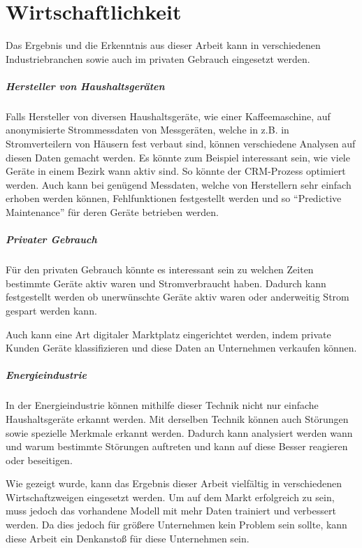 \chapter{Wirtschaftlichkeit}
    Das Ergebnis und die Erkenntnis aus dieser Arbeit kann in verschiedenen Industriebranchen sowie auch im privaten Gebrauch eingesetzt werden.

    \paragraph{Hersteller von Haushaltsgeräten}
    Falls Hersteller von diversen Haushaltsgeräte, wie einer Kaffeemaschine, auf anonymisierte Strommessdaten von Messgeräten, welche in z.B. in Stromverteilern von Häusern fest verbaut sind, können verschiedene Analysen auf diesen Daten gemacht werden.
    Es könnte zum Beispiel interessant sein, wie viele Geräte in einem Bezirk wann aktiv sind. 
    So könnte der \ac{CRM}-Prozess optimiert werden.
    Auch kann bei genügend Messdaten, welche von Herstellern sehr einfach erhoben werden können, Fehlfunktionen festgestellt werden und so "`Predictive Maintenance"' für deren Geräte betrieben werden.

    \paragraph{Privater Gebrauch}
    Für den privaten Gebrauch könnte es interessant sein zu welchen Zeiten bestimmte Geräte aktiv waren und Stromverbraucht haben.
    Dadurch kann festgestellt werden ob unerwünschte Geräte aktiv waren oder anderweitig Strom gespart werden kann.
    
    Auch kann eine Art digitaler Marktplatz eingerichtet werden, indem private Kunden Geräte klassifizieren und diese Daten an Unternehmen verkaufen können.

    \paragraph{Energieindustrie}
    In der Energieindustrie können mithilfe dieser Technik nicht nur einfache Haushaltsgeräte erkannt werden. 
    Mit derselben Technik können auch Störungen sowie spezielle Merkmale erkannt werden. 
    Dadurch kann analysiert werden wann und warum bestimmte Störungen auftreten und kann auf diese Besser reagieren oder beseitigen.
    \newline

    Wie gezeigt wurde, kann das Ergebnis dieser Arbeit vielfältig in verschiedenen Wirtschaftzweigen eingesetzt werden.
    Um auf dem Markt erfolgreich zu sein, muss jedoch das vorhandene Modell mit mehr Daten trainiert und verbessert werden.
    Da dies jedoch für größere Unternehmen kein Problem sein sollte, kann diese Arbeit ein Denkanstoß für diese Unternehmen sein.